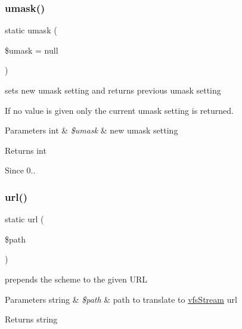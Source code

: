 \subsubsection{\texorpdfstring{umask()}{umask()}}
{\footnotesize\ttfamily static umask (\begin{DoxyParamCaption}\item[{}]{\$umask = {\ttfamily null} }\end{DoxyParamCaption})\hspace{0.3cm}{\ttfamily [static]}}

sets new umask setting and returns previous umask setting

If no value is given only the current umask setting is returned.


\begin{DoxyParams}[1]{Parameters}
int & {\em \$umask} & new umask setting \\
\hline
\end{DoxyParams}
\begin{DoxyReturn}{Returns}
int 
\end{DoxyReturn}
\begin{DoxySince}{Since}
0.. 
\end{DoxySince}
\mbox{\label{classorg_1_1bovigo_1_1vfs_1_1vfs_stream_a1dbaa0b09758fa82fedc57215170496d}} 
\subsubsection{\texorpdfstring{url()}{url()}}
{\footnotesize\ttfamily static url (\begin{DoxyParamCaption}\item[{}]{\$path }\end{DoxyParamCaption})\hspace{0.3cm}{\ttfamily [static]}}

prepends the scheme to the given U\+RL


\begin{DoxyParams}[1]{Parameters}
string & {\em \$path} & path to translate to \mbox{\hyperlink{classorg_1_1bovigo_1_1vfs_1_1vfs_stream}{vfs\+Stream}} url \\
\hline
\end{DoxyParams}
\begin{DoxyReturn}{Returns}
string 
\end{DoxyReturn}


